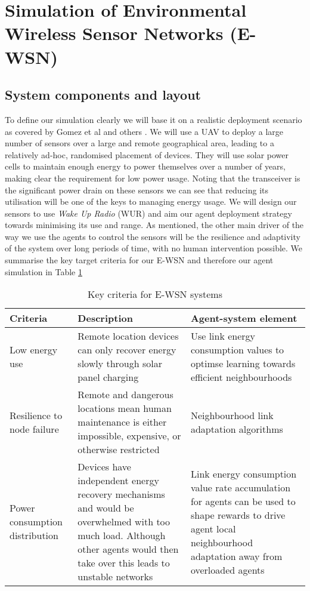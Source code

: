 \section{Simulation of Environmental Wireless Sensor Networks (E-WSN)}
	
	\subsection{System components and layout}
	
	To define our simulation clearly we will base it on a realistic deployment scenario as covered by Gomez et al \cite{Gomez} and others \cite{Jha2016, Avram}. We will use a UAV to deploy a large number of sensors over a large and remote geographical area, leading to a relatively ad-hoc, randomised placement of devices. They will use solar power cells to maintain enough energy to power themselves over a number of years, making clear the requirement for low power usage. Noting that the transceiver is the significant power drain on these sensors we can see that reducing its utilisation will be one of the keys to managing energy usage. We will design our sensors to use \textit{Wake Up Radio} (WUR) and aim our agent deployment strategy towards minimising its use and range. As mentioned, the other main driver of the way we use the agents to control the sensors will be the resilience and adaptivity of the system over long periods of time, with no human intervention possible.  We summarise the key target criteria for our E-WSN and therefore our agent simulation in Table \ref {table:real_world_systems_criteria} 
	\begin{table}
		\begin{tabular}{p{}p{} p{}}
			\hline
			\textbf{Criteria} & \textbf{Description} & \textbf{Agent-system element} \\
			\hline
			Low energy use & Remote location devices can only recover energy slowly through solar panel charging &  Use link energy consumption values to optimse learning towards efficient neighbourhoods \\
			Resilience to node failure & Remote and dangerous locations mean human maintenance is either impossible, expensive, or otherwise restricted & Neighbourhood link adaptation algorithms \\	
			Power consumption distribution & Devices have independent energy recovery mechanisms and would be overwhelmed with too much load. Although other agents would then take over this leads to unstable networks & Link energy consumption value rate accumulation for agents can be used to shape rewards to drive agent local neighbourhood adaptation away from overloaded agents  \\ 
			\hline
		\end{tabular}
		\caption{Key criteria for E-WSN systems}
		\label{table:real_world_systems_criteria}
	\end{table}
	


